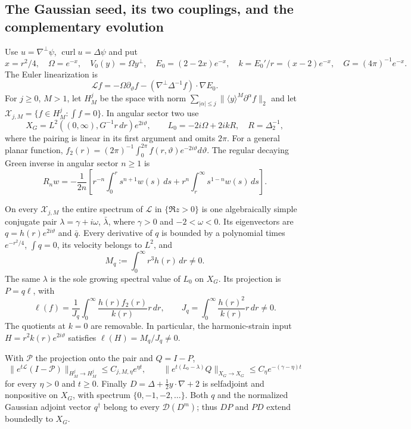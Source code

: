 \subsection{The Gaussian seed, its two couplings, and the complementary evolution}
\label{sec:short-gaussian-seed}

Use $u=\nabla^\perp\psi$, $\operatorname{curl}u=\Delta\psi$ and put
\[
 x=r^2/4,\quad \Omega=e^{-x},\quad
 V_0(y)=\Omega y^\perp,\quad E_0=(2-2x)e^{-x},\quad
 k=E_0'/r=(x-2)e^{-x},\quad G=(4\pi)^{-1}e^{-x}.
\]
The Euler linearization is
\[
 \mathscr Lf=-\Omega\partial_\vartheta f
       -(\nabla^\perp\Delta^{-1}f)\cdot\nabla E_0.
\]
For $j\ge0$, $M>1$, let $H^j_M$ be the space with norm
$\sum_{|\alpha|\le j}\|\langle y\rangle^M\partial^\alpha f\|_2$ and let
$\mathcal X_{j,M}=\{f\in H^j_M:\int f=0\}$.
In angular sector two use
\[
 X_G=L^2((0,\infty),G^{-1}r\,dr)e^{2i\vartheta},\qquad
 L_0=-2i\Omega+2ikR,\quad R=\Delta_2^{-1},
\]
where the pairing is linear in its first argument and omits $2\pi$.
For a general planar function, $f_2(r)=(2\pi)^{-1}\int_0^{2\pi}
f(r,\vartheta)e^{-2i\vartheta}d\vartheta$.
The regular decaying Green inverse in angular sector $n\ge1$ is
\begin{equation}\label{eq:short-seed-green}
 R_nw=-\frac1{2n}\left[
 r^{-n}\int_0^r s^{n+1}w(s)\,ds+
 r^n\int_r^\infty s^{1-n}w(s)\,ds\right].
\end{equation}

\begin{proposition}\label{prop:short-gaussian-seed}
On every $\mathcal X_{j,M}$ the entire spectrum of $\mathscr L$ in
$\{\Re z>0\}$ is one algebraically simple conjugate pair
$\lambda=\gamma+i\omega$, $\bar\lambda$, where $\gamma>0$ and
$-2<\omega<0$. Its eigenvectors are $q=h(r)e^{2i\vartheta}$ and
$\bar q$. Every derivative of $q$ is bounded by a polynomial times
$e^{-r^2/4}$, $\int q=0$, its velocity belongs to $L^2$, and
\[
 M_q:=\int_0^\infty r^3h(r)\,dr\ne0.
\]
The same $\lambda$ is the sole growing spectral value of $L_0$ on $X_G$.
Its projection is $P=q\ell$, with
\begin{equation}\label{eq:short-seed-functional}
 \ell(f)=\frac1{J_q}\int_0^\infty
       \frac{h(r)f_2(r)}{k(r)}r\,dr,\qquad
 J_q=\int_0^\infty\frac{h(r)^2}{k(r)}r\,dr\ne0.
\end{equation}
The quotients at $k=0$ are removable. In particular, the harmonic-strain
input $H=r^2k(r)e^{2i\vartheta}$ satisfies $\ell(H)=M_q/J_q\ne0$.

With $\mathscr P$ the projection onto the pair and $Q=I-P$,
\begin{equation}\label{eq:short-seed-complement}
 \|e^{t\mathscr L}(I-\mathscr P)\|_{H^j_M\to H^j_M}
       \le C_{j,M,\eta}e^{\eta t},\qquad
 \|e^{t(L_0-\lambda)}Q\|_{X_G\to X_G}
       \le C_\eta e^{-(\gamma-\eta)t}
\end{equation}
for every $\eta>0$ and $t\ge0$. Finally
$D=\Delta+\frac12y\cdot\nabla+2$ is selfadjoint and nonpositive on
$X_G$, with spectrum $\{0,-1,-2,\ldots\}$. Both $q$ and the normalized
Gaussian adjoint vector $q^\dagger$ belong to every $\mathcal D(D^m)$;
thus $DP$ and $PD$ extend boundedly to $X_G$.
\end{proposition}

